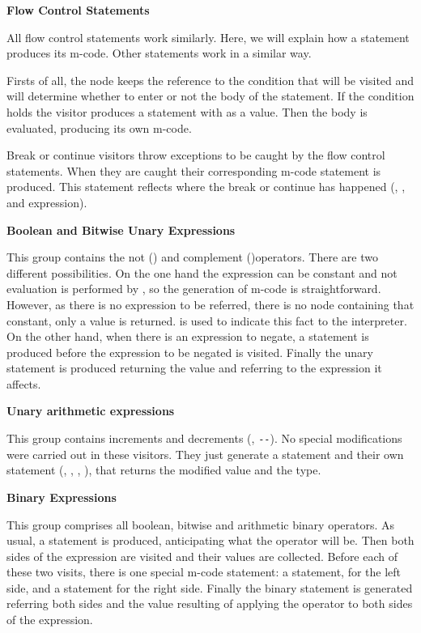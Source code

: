 {\bf{Flow Control Statements}}

All flow control statements work similarly. Here, we will explain how a  statement produces its m-code. Other statements work in a similar way.

Firsts of all, the  node keeps the reference to the condition that will be visited and will determine whether to enter or not the body of the statement. If the condition holds the
visitor produces a  statement with  as a value. Then the body is evaluated, producing its own m-code.

Break or continue visitors throw exceptions to be caught by the flow control statements. When they are caught their corresponding m-code statement is produced. This statement reflects where the break or
continue has happened (, ,  and  expression).

{\bf{Boolean and Bitwise Unary Expressions}}

This group contains the not (\p{!}) and complement (\p{\~})operators. There are two different possibilities. On the one hand the expression can be constant and not evaluation is performed by \djava{}, so the generation of m-code is straightforward. However, as there is no expression to be referred, there is no node containing that constant, only a value is returned.  is used to indicate this fact to the interpreter. On the other hand, when there is an expression to negate, a  statement is produced before the expression to be negated is visited. Finally the unary statement is produced returning the value and referring to the expression it affects. 

{\bf{Unary arithmetic expressions}}

This group contains increments and decrements (\p{++}, \verb|--|). No special modifications were carried out in these visitors. They just generate a  statement and their own statement
(, , , ), that returns the modified value and the type.

{\bf{Binary Expressions}}

This group comprises all boolean, bitwise and arithmetic binary operators. As usual, a  statement is produced, anticipating what the operator will be. Then both sides of the expression are visited and their values are collected. Before each of these two visits, there is one special m-code statement: a  statement, for the left side, and a  statement for the right side. Finally the binary statement is generated referring both sides and the value resulting of applying the
operator to both sides of the expression.

